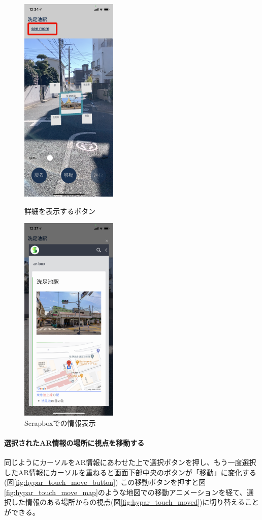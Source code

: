 \begin{figure}[H]
  \begin{minipage}{0.5\hsize}
    \centering
    \includegraphics[height=100mm]{images/hypar_touch_top.png}
    \caption{詳細を表示するボタン} \label{fig:hypar_touch_top}
  \end{minipage}
  \begin{minipage}{0.5\hsize}
    \centering
    \includegraphics[height=100mm]{images/hypar_touch_webview.png}
    \caption{Scrapboxでの情報表示} \label{fig:hypar_touch_webview}
  \end{minipage}
\end{figure}

\paragraph*{選択されたAR情報の場所に視点を移動する}
同じようにカーソルをAR情報にあわせた上で選択ボタンを押し、もう一度選択したAR情報にカーソルを重ねると画面下部中央のボタンが「移動」に変化する(図\ref{fig:hypar_touch_move_button})
この移動ボタンを押すと図\ref{fig:hypar_touch_move_map}のような地図での移動アニメーションを経て、選択した情報のある場所からの視点(図\ref{fig:hypar_touch_moved})に切り替えることができる。

